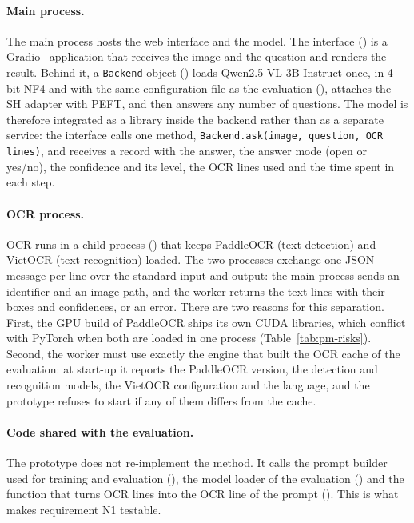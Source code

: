 \paragraph{Main process.} The main process hosts the web interface and the model. The
interface () is a Gradio~\cite{abid2019gradio} application that
receives the image and the question and renders the result. Behind it, a \texttt{Backend}
object () loads Qwen2.5-VL-3B-Instruct once, in 4-bit NF4 and
with the same configuration file as the evaluation (), attaches
the SH adapter with PEFT, and then answers any number of questions. The model is therefore
integrated as a library inside the backend rather than as a separate service: the interface
calls one method, \texttt{Backend.ask(image, question, OCR lines)}, and receives a record
with the answer, the answer mode (open or yes/no), the confidence and its level, the OCR
lines used and the time spent in each step.

\paragraph{OCR process.} OCR runs in a child process () that
keeps PaddleOCR (text detection) and VietOCR (text recognition) loaded. The two processes
exchange one JSON message per line over the standard input and output: the main process sends
an identifier and an image path, and the worker returns the text lines with their boxes and
confidences, or an error. There are two reasons for this separation. First, the GPU build of
PaddleOCR ships its own CUDA libraries, which conflict with PyTorch when both are loaded in
one process (Table~\ref{tab:pm-risks}). Second, the worker must use exactly the engine that
built the OCR cache of the evaluation: at start-up it reports the PaddleOCR version, the
detection and recognition models, the VietOCR configuration and the language, and the
prototype refuses to start if any of them differs from the cache.

\paragraph{Code shared with the evaluation.} The prototype does not re-implement the method.
It calls the prompt builder used for training and evaluation (),
the model loader of the evaluation () and the function that turns
OCR lines into the OCR line of the prompt (). This is what makes
requirement N1 testable.

